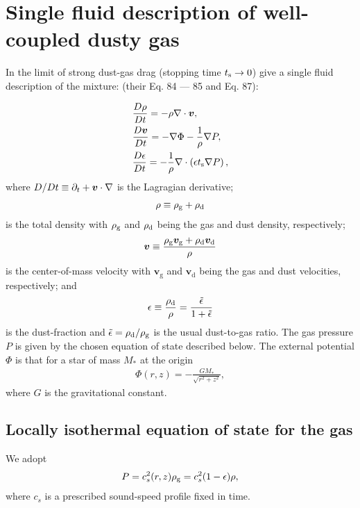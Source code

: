 \section{Single fluid description of well-coupled dusty gas}\label{setup} 
In the limit of strong dust-gas drag (stopping time $t_\mathrm{s}\to 0$) 
\cite{laibe14} give a single fluid description of the mixture:  
(their Eq. 84 --- 85 and Eq. 87): 

\begin{align}
  &\frac{D\rho}{Dt} = -\rho\nabla\cdot\bm{v}, \label{masseq}\\ 
  &\frac{D\bm{v}}{Dt} = - \nabla\Phi - \frac{1}{\rho}\nabla
  P, \label{momeq}\\ 
  &\frac{D\epsilon}{Dt} = -\frac{1}{\rho} \nabla \cdot \left(\epsilon 
  t_\mathrm{s} \nabla P \right),\label{dusteq}  
\end{align}
where $D/Dt \equiv \partial_t + \bm{v}\cdot\nabla$ is the Lagragian
derivative; 
\begin{align}
  \rho \equiv \rho_\mathrm{g} + \rho_\mathrm{d}
\end{align}
is the total density with $\rho_\mathrm{g}$ and $\rho_\mathrm{d}$ being the gas and dust
density, respectively; 
\begin{align}
  \bm{v} \equiv \frac{\rho_\mathrm{g}\bm{v}_\mathrm{g} + 
    \rho_\mathrm{d}\bm{v}_\mathrm{d}}{\rho}
\end{align}
is the center-of-mass velocity with $\bm{v}_\mathrm{g}$ and
$\bm{v}_\mathrm{d}$ being the gas and dust velocities, respectively; 
and 
\begin{align}
  \epsilon \equiv \frac{\rho_\mathrm{d}}{\rho}  = \frac{\tilde{\epsilon}}{1+\tilde{\epsilon}} 
\end{align}
is the dust-fraction and $\tilde{\epsilon}=\rho_\mathrm{d}/\rho_\mathrm{g}$ is the usual
dust-to-gas ratio. The gas pressure $P$ is given by the chosen 
equation of state described below. The external potential $\Phi$ is
that for a star of mass $M_*$ at the origin 
\begin{align}
  \Phi(r,z) =-\frac{GM_*}{\sqrt{r^2 + z^2}},
\end{align}
where $G$ is the gravitational constant. 


\subsection{Locally isothermal equation of state for the gas} 
We adopt 
\begin{align}\label{eos}
  P = c_s^2(r,z)\rho_\mathrm{g} = c_s^{2}(1 - \epsilon)\rho,   
\end{align}
where $c_s$ is a prescribed sound-speed profile fixed in time.  

